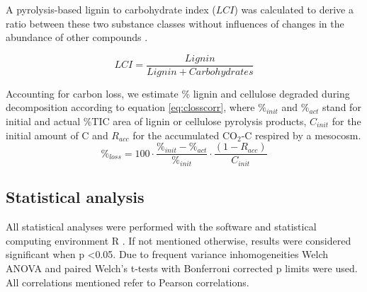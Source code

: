 A pyrolysis-based lignin to carbohydrate index ($LCI$) was calculated to derive a ratio between these two substance classes without influences of changes in the abundance of other compounds . 

\begin{equation}
 LCI=\frac{Lignin}{Lignin + Carbohydrates}
\end{equation}

Accounting for carbon loss, we estimate \% lignin and cellulose degraded during decomposition according to equation \ref{eq:closscorr}, where \emph{$\%_{init}$} and \emph{$\%_{act}$} stand for initial and actual \%TIC area of lignin or cellulose pyrolysis products, \emph{$C_{init}$} for the initial amount of C and \emph{$R_{acc}$} for the accumulated CO$_2$-C respired by a mesocosm.
\begin{equation}
 \%_{loss} = 100\cdot\frac{\%_{init}-\%_{act}}{\%_{init}}\cdot\frac{\left ( 1-R_{acc}\right ) }{C_{init}}
 \label{eq:closscorr}
\end{equation}

\subsection*{Statistical analysis}
All statistical analyses were performed with the software and statistical computing environment R \cite{R}. If not mentioned otherwise, results were considered significant when p \textless 0.05. Due to frequent variance inhomogeneities Welch ANOVA and paired Welch's t-tests with Bonferroni corrected p limits were used. All correlations mentioned refer to Pearson correlations. 
